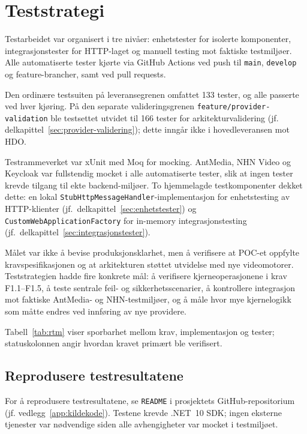\section{Teststrategi}
\label{sec:teststrategi}
Testarbeidet var organisert i tre nivåer: enhetstester for isolerte
komponenter, integrasjonstester for HTTP-laget og manuell testing mot
faktiske testmiljøer. Alle automatiserte tester kjørte via GitHub Actions
ved push til \texttt{main}, \texttt{develop} og feature-brancher, samt
ved pull requests.

Den ordinære testsuiten på leveransegrenen omfattet 133 tester, og alle
passerte ved hver kjøring. På den separate valideringsgrenen
\texttt{feature/provider-validation} ble testsettet utvidet til 166
tester for arkitekturvalidering (jf. delkapittel~\ref{sec:provider-validering});
dette inngår ikke i hovedleveransen mot HDO.

Testrammeverket var xUnit med Moq for mocking. AntMedia, NHN Video og
Keycloak var fullstendig mocket i alle automatiserte tester, slik at ingen
tester krevde tilgang til ekte backend-miljøer. To hjemmelagde
testkomponenter dekket dette: en lokal
\texttt{StubHttpMessageHandler}-implementasjon for enhetstesting av
HTTP-klienter (jf.\ delkapittel~\ref{sec:enhetstester}) og
\texttt{CustomWebApplicationFactory} for in-memory integrasjonstesting
(jf.\ delkapittel~\ref{sec:integrasjonstester}).

Målet var ikke å bevise produksjonsklarhet, men å verifisere at
POC-et oppfylte kravspesifikasjonen og at arkitekturen støttet
utvidelse med nye videomotorer. Teststrategien hadde fire konkrete mål:
å verifisere kjerneoperasjonene i krav F1.1--F1.5, å teste sentrale feil-
og sikkerhetsscenarier, å kontrollere integrasjon mot faktiske AntMedia-
og NHN-testmiljøer, og å måle hvor mye kjernelogikk som måtte endres ved
innføring av nye providere.

Tabell~\ref{tab:rtm} viser
sporbarhet mellom krav, implementasjon og tester; statuskolonnen angir
hvordan kravet primært ble verifisert.
\newpage


\subsection{Reprodusere testresultatene}
\label{subsec:reprodusere-tester}
For å reprodusere testresultatene, se \texttt{README} i prosjektets
GitHub-repositorium (jf. vedlegg~\ref{app:kildekode}). Testene krevde
.NET~10 SDK; ingen eksterne tjenester var nødvendige siden alle
avhengigheter var mocket i testmiljøet.
